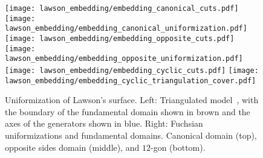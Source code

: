 \documentclass[Thesis]{subfiles}
\begin{document}




\begin{figure}
	\centering
	\resizebox{\textwidth}{!} {
	\texttt{[image: lawson\_embedding/embedding\_canonical\_cuts.pdf]}
	\texttt{[image: lawson\_embedding/embedding\_canonical\_uniformization.pdf]}
	}
	\resizebox{\textwidth}{!} {
	\texttt{[image: lawson\_embedding/embedding\_opposite\_cuts.pdf]}
	\texttt{[image: lawson\_embedding/embedding\_opposite\_uniformization.pdf]}
	}
	\resizebox{\textwidth}{!} {
	\texttt{[image: lawson\_embedding/embedding\_cyclic\_cuts.pdf]}
	\texttt{[image: lawson\_embedding/embedding\_cyclic\_triangulation\_cover.pdf]}
	}
	\caption{Uniformization of Lawson's surface. Left:
          Triangulated model~\cite{polthier97}, with the boundary of
          the fundamental domain shown in brown and the axes of the
          generators shown in blue. Right: Fuchsian uniformizations and
          fundamental domains. Canonical domain (top), opposite sides
          domain (middle), and $12$-gon (bottom).}
	\label{fig:lawson_embedding}
\end{figure}
\end{document}

